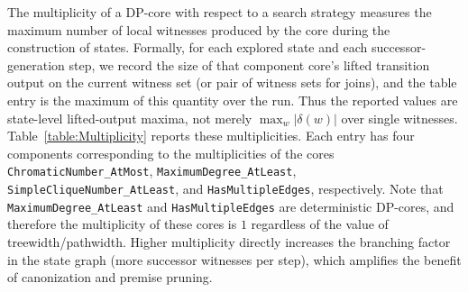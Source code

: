 \documentclass[11pt,a4paper]{article}
\begin{document}
The multiplicity of a DP-core with respect to a search strategy measures the maximum number of local witnesses produced by the core during the construction of states. Formally, for each explored state and each successor-generation step, we record the size of that component core's lifted transition output on the current witness set (or pair of witness sets for joins), and the table entry is the maximum of this quantity over the run. Thus the reported values are state-level lifted-output maxima, not merely $\max_w|\delta(w)|$ over single witnesses. Table~\ref{table:Multiplicity} reports these multiplicities. Each entry has four components corresponding to the multiplicities of the cores \texttt{ChromaticNumber\_AtMost}, \texttt{MaximumDegree\_AtLeast}, \texttt{SimpleCliqueNumber\_AtLeast}, and \texttt{HasMultipleEdges}, respectively. Note that \texttt{MaximumDegree\_AtLeast} and \texttt{HasMultipleEdges} are deterministic DP-cores, and therefore the multiplicity of these cores is $1$ regardless of the value of treewidth/pathwidth.
Higher multiplicity directly increases the branching factor in the state graph (more successor witnesses per step), which amplifies the benefit of canonization and premise pruning.
\end{document}
